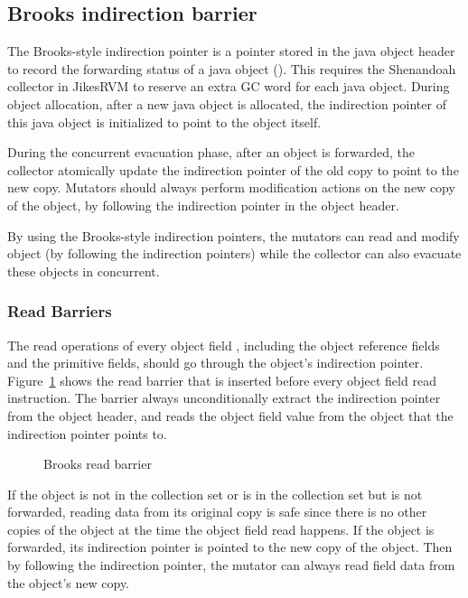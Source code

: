\subsection{Brooks indirection barrier}


The Brooks-style indirection pointer is a pointer stored in the java object header
to record the forwarding status of a java object (\cite{flood2016shenandoah}).
This requires the Shenandoah collector in JikesRVM to reserve an extra GC word for each
java object. During object allocation, after a new java object is allocated, the indirection
pointer of this java object is initialized to point to the object itself.

During the concurrent evacuation phase, after an object is forwarded,
the collector atomically update the indirection pointer of the old copy to point to the new copy.
Mutators should always perform modification actions on the new copy of the object,
by following the indirection pointer in the object header.

By using the Brooks-style indirection pointers, the mutators can read and modify object 
(by following the indirection pointers) while the collector can also evacuate these
objects in concurrent.

\subsubsection{Read Barriers}

The read operations of every object field , including the object
reference fields and the primitive fields, should go through the object's indirection pointer.
Figure~\ref{fig:brooksreadbarrier} shows the read barrier that is inserted before every object field read instruction.
The barrier always unconditionally extract the indirection pointer from the object header,
and reads the object field value from the object that the indirection pointer points to.

\begin{figure}
  \centering
  
  \caption{Brooks read barrier}
  \label{fig:brooksreadbarrier}
\end{figure}

If the object is not in the collection set or is in the collection set but is not forwarded,
reading data from its original copy is safe since there is no other copies of the object
at the time the object field read happens.
If the object is forwarded, its indirection pointer is pointed to the new copy of the object.
Then by following the indirection pointer, the mutator can always read field data from the object's new copy.

